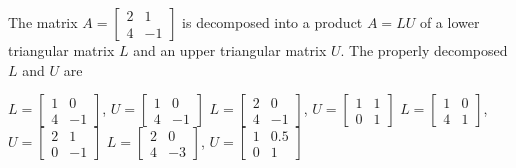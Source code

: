 \begin{question}[id=gate-ee2011-1, source=GATE EE 2011, marks=2]
The matrix $A = \begin{bmatrix} 2 & 1 \\ 4 & -1 \end{bmatrix}$ is decomposed into a product $A = LU$ of a lower triangular matrix $L$ and an upper triangular matrix $U$. The properly decomposed $L$ and $U$ are
\begin{options}
  \option $L = \begin{bmatrix} 1 & 0 \\ 4 & -1 \end{bmatrix}$, $U = \begin{bmatrix} 1 & 0 \\ 4 & -1 \end{bmatrix}$
  \option $L = \begin{bmatrix} 2 & 0 \\ 4 & -1 \end{bmatrix}$, $U = \begin{bmatrix} 1 & 1 \\ 0 & 1 \end{bmatrix}$
  \option $L = \begin{bmatrix} 1 & 0 \\ 4 & 1 \end{bmatrix}$, $U = \begin{bmatrix} 2 & 1 \\ 0 & -1 \end{bmatrix}$
  \correct $L = \begin{bmatrix} 2 & 0 \\ 4 & -3 \end{bmatrix}$, $U = \begin{bmatrix} 1 & 0.5 \\ 0 & 1 \end{bmatrix}$
\end{options}
\begin{solution}

\end{solution}
\end{question}
